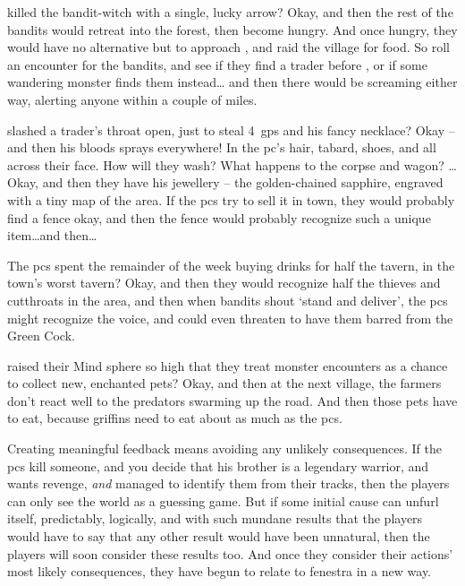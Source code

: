 \begin{multicols}{2}
 killed the bandit-\gls{witch} with a single, lucky arrow?
Okay, and then the rest of the bandits would retreat into the forest, then become hungry.
And once hungry, they would have no alternative but to approach , and raid the \gls{village} for food.
So roll an encounter for the bandits, and see if they find a trader before , or if some wandering \gls{monster} finds them instead\ldots
and then there would be screaming either way, alerting anyone within a couple of miles.

 slashed a trader's throat open, just to steal 4~\glspl{gp} and his fancy necklace?
Okay -- and then his bloods sprays everywhere!
In the \gls{pc}'s hair, tabard, shoes, and all across their face.
How will they wash?
What happens to the corpse and wagon?
\ldots Okay, and then they have his jewellery -- the golden-chained sapphire, engraved with a tiny map of the area.
If the \glspl{pc} try to sell it in town, they would probably find a fence okay, and then the fence would probably recognize such a unique item\ldots and then\ldots

The \glspl{pc} spent the remainder of the week buying drinks for half the tavern, in the town's worst tavern?
Okay, and then they would recognize half the thieves and cutthroats in the area, and then when bandits shout `stand and deliver', the \glspl{pc} might recognize the voice, and could even threaten to have them barred from the Green Cock.

 raised their Mind \gls{sphere} so high that they treat \gls{monster} encounters as a chance to collect new, enchanted pets?
Okay, and then at the next \gls{village}, the farmers don't react well to the predators swarming up the road.
And then those pets have to eat, because \glspl{griffin} need to eat about as much as the \glspl{pc}.

Creating meaningful feedback means avoiding any unlikely consequences.
If the \glspl{pc} kill someone, and you decide that his brother is a legendary warrior, and wants revenge, \textit{and} managed to identify them from their tracks, then the players can only see the world as a guessing game.
But if some initial cause can unfurl itself, predictably, logically, and with such mundane results that the players would have to say that any other result would have been unnatural, then the players will soon consider these results too.
And once they consider their actions' most likely consequences, they have begun to relate to \gls{fenestra} in a new way.


\end{multicols}
